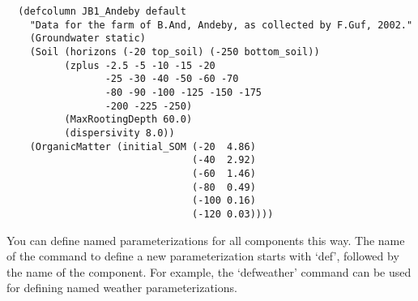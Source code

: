\begin{verbatim}
  (defcolumn JB1_Andeby default
    "Data for the farm of B.And, Andeby, as collected by F.Guf, 2002."
    (Groundwater static)
    (Soil (horizons (-20 top_soil) (-250 bottom_soil))
          (zplus -2.5 -5 -10 -15 -20
                 -25 -30 -40 -50 -60 -70
                 -80 -90 -100 -125 -150 -175
                 -200 -225 -250)
          (MaxRootingDepth 60.0)
          (dispersivity 8.0))
    (OrganicMatter (initial_SOM (-20  4.86)
                                (-40  2.92)
                                (-60  1.46)
                                (-80  0.49)
                                (-100 0.16)
                                (-120 0.03))))
\end{verbatim}

You can define named parameterizations for all components this way.
The name of the command to define a new parameterization starts with
`def', followed by the name of the component.  For example, the
`defweather' command can be used for defining named weather
parameterizations.

